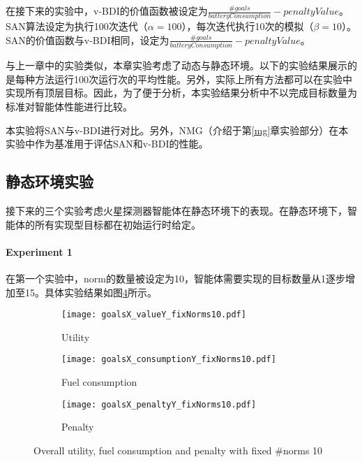 在接下来的实验中，v-BDI的价值函数被设定为$\frac{\#goals}{batteryConsumption} - penaltyValue$。SAN算法设定为执行100次迭代（$\alpha = 100$），每次迭代执行10次的模拟（$\beta = 10$）。SAN的价值函数与v-BDI相同，设定为$\frac{\#goals}{batteryConsumption} - penaltyValue$。

与上一章中的实验类似，本章实验考虑了动态与静态环境。以下的实验结果展示的是每种方法运行100次运行次的平均性能。另外，实际上所有方法都可以在实验中实现所有顶层目标。因此，为了便于分析，本实验结果分析中不以完成目标数量为标准对智能体性能进行比较。

本实验将SAN与v-BDI进行对比。另外，NMG（介绍于第\ref{mg}章实验部分）在本实验中作为基准用于评估SAN和v-BDI的性能。
\subsection{静态环境实验}
接下来的三个实验考虑火星探测器智能体在静态环境下的表现。在静态环境下，智能体的所有实现型目标都在初始运行时给定。
\paragraph{Experiment 1}
在第一个实验中，norm的数量被设定为10，智能体需要实现的目标数量从1逐步增加至15。具体实验结果如图\ref{fig:all_fixNorms10}所示。

\begin{figure}
\centering
\begin{subfigure}{.47\textwidth}
  \centering
  \texttt{[image: goalsX\_valueY\_fixNorms10.pdf]}
  \captionsetup{justification=centering}
  \caption{Utility}
  \label{fig:goalsX_valueY_fixNorms10}
\end{subfigure}

\begin{subfigure}{.47\textwidth}
  \centering
  \texttt{[image: goalsX\_consumptionY\_fixNorms10.pdf]}
  \captionsetup{justification=centering}
  \caption{Fuel consumption}
  \label{fig:goalsX_consumptionY_fixNorms10}
\end{subfigure}
\begin{subfigure}{.47\textwidth}
  \centering
  \texttt{[image: goalsX\_penaltyY\_fixNorms10.pdf]}
  \captionsetup{justification=centering}
  \caption{Penalty}
  \label{fig:goalsX_penaltyY_fixNorms10}
\end{subfigure}
\captionsetup{justification=centering}
\caption{Overall utility, fuel consumption and penalty with fixed \#norms 10}
\label{fig:all_fixNorms10}
\end{figure}

